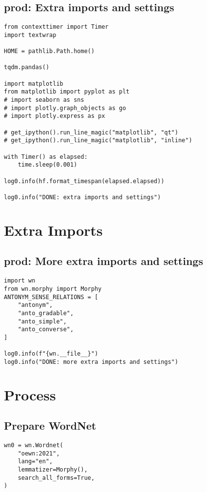 \documentclass[a4paper,10pt,onecolumn,oneside,openright]{article}
\begin{document}
\subsection{prod: Extra imports and settings}
\label{sec:orgd5c415d}
\begin{verbatim}
from contexttimer import Timer
import textwrap

HOME = pathlib.Path.home()

tqdm.pandas()

import matplotlib
from matplotlib import pyplot as plt
# import seaborn as sns
# import plotly.graph_objects as go
# import plotly.express as px

# get_ipython().run_line_magic("matplotlib", "qt")
# get_ipython().run_line_magic("matplotlib", "inline")

with Timer() as elapsed:
    time.sleep(0.001)

log0.info(hf.format_timespan(elapsed.elapsed))

log0.info("DONE: extra imports and settings")
\end{verbatim}

\section{Extra Imports}
\label{sec:orga801448}
\subsection{prod: More extra imports and settings}
\label{sec:orgf769a54}
\begin{verbatim}
import wn
from wn.morphy import Morphy
ANTONYM_SENSE_RELATIONS = [
    "antonym",
    "anto_gradable",
    "anto_simple",
    "anto_converse",
]

log0.info(f"{wn.__file__}")
log0.info("DONE: more extra imports and settings")
\end{verbatim}

\section{Process}
\label{sec:orgf80324b}
\subsection{Prepare WordNet}
\label{sec:org90d9fdb}
\begin{verbatim}
wn0 = wn.Wordnet(
    "oewn:2021",
    lang="en",
    lemmatizer=Morphy(),
    search_all_forms=True,
)
\end{verbatim}
\end{document}
